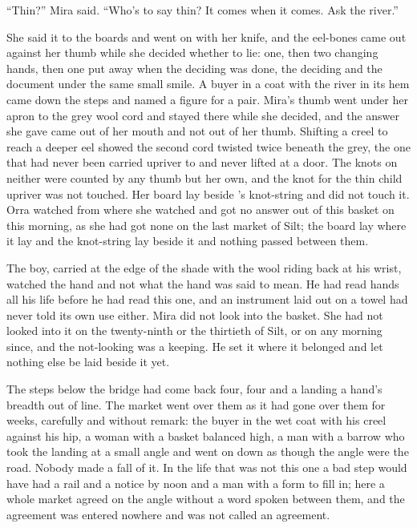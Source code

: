 “Thin?” Mira said. “Who's to say thin? It comes when it comes. Ask the river.”

She said it to the boards and went on with her knife, and the eel-bones came out against her thumb while she decided whether to lie: one, then two changing hands, then one put away when the deciding was done, the deciding and the document under the same small smile. A buyer in a coat with the river in its hem came down the steps and named a figure for a pair. Mira's thumb went under her apron to the grey wool cord and stayed there while she decided, and the answer she gave came out of her mouth and not out of her thumb. Shifting a creel to reach a deeper eel showed the second cord twisted twice beneath the grey, the one that had never been carried upriver to  and never lifted at a door. The knots on neither were counted by any thumb but her own, and the knot for the thin child upriver was not touched. Her board lay beside 's knot-string and did not touch it. Orra watched from where she watched and got no answer out of this basket on this morning, as she had got none on the last market of Silt; the board lay where it lay and the knot-string lay beside it and nothing passed between them.

The boy, carried at the edge of the shade with the wool riding back at his wrist, watched the hand and not what the hand was said to mean. He had read hands all his life before he had read this one, and an instrument laid out on a towel had never told its own use either. Mira did not look into the basket. She had not looked into it on the twenty-ninth or the thirtieth of Silt, or on any morning since, and the not-looking was a keeping. He set it where it belonged and let nothing else be laid beside it yet.

\scenebreak

The steps below the bridge had come back four, four and a landing a hand's breadth out of line. The market went over them as it had gone over them for weeks, carefully and without remark: the buyer in the wet coat with his creel against his hip, a woman with a basket balanced high, a man with a barrow who took the landing at a small angle and went on down as though the angle were the road. Nobody made a fall of it. In the life that was not this one a bad step would have had a rail and a notice by noon and a man with a form to fill in; here a whole market agreed on the angle without a word spoken between them, and the agreement was entered nowhere and was not called an agreement.

